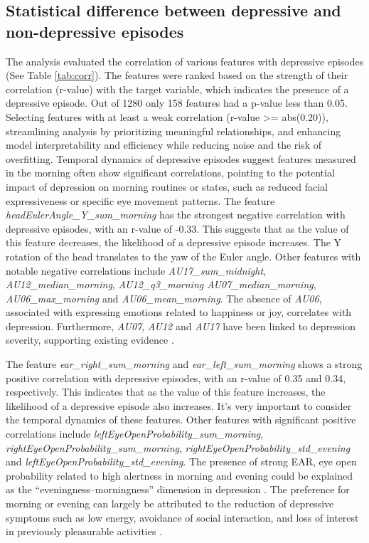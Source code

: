 \subsection{Statistical difference between depressive and non-depressive episodes}

The analysis evaluated the correlation of various features with depressive episodes (See Table \ref{tab:corr}). The features were ranked based on the strength of their correlation (r-value) with the target variable, which indicates the presence of a depressive episode. Out of 1280 only 158 features had a p-value less than 0.05. Selecting features with at least a weak correlation (r-value >= abs(0.20)), streamlining analysis by prioritizing meaningful relationships, and enhancing model interpretability and efficiency while reducing noise and the risk of overfitting. Temporal dynamics of depressive episodes suggest features measured in the morning often show significant correlations, pointing to the potential impact of depression on morning routines or states, such as reduced facial expressiveness or specific eye movement patterns. The feature \textit{headEulerAngle\_Y\_sum\_morning} has the strongest negative correlation with depressive episodes, with an r-value of -0.33. This suggests that as the value of this feature decreases, the likelihood of a depressive episode increases. The Y rotation of the head translates to the yaw of the Euler angle. Other features with notable negative correlations include \textit{AU17\_sum\_midnight}, \textit{AU12\_median\_morning}, \textit{AU12\_q3\_morning} \textit{AU07\_median\_morning}, \textit{AU06\_max\_morning} and \textit{AU06\_mean\_morning}. The absence of \textit{AU06}, associated with expressing emotions related to happiness or joy, correlates with depression. Furthermore, \textit{AU07}, \textit{AU12} and \textit{AU17} have been linked to depression severity, supporting existing evidence \cite{song2020spectral, gavrilescu2019predicting}.

The feature \textit{ear\_right\_sum\_morning} and \textit{ear\_left\_sum\_morning} shows a strong positive correlation with depressive episodes, with an r-value of 0.35 and 0.34, respectively. This indicates that as the value of this feature increases, the likelihood of a depressive episode also increases. It's very important to consider the temporal dynamics of these features. Other features with significant positive correlations include \textit{leftEyeOpenProbability\_sum\_morning}, \textit{rightEyeOpenProbability\_sum\_morning}, \textit{rightEyeOpenProbability\_std\_evening} and \textit{leftEyeOpenProbability\_std\_evening}. The presence of strong EAR, eye open probability related to high alertness \cite{abe2023perclos} in morning and evening could be explained as the “eveningness–morningness” dimension in depression \cite{chelminski1999analysis}. The preference for morning or evening can largely be attributed to the reduction of depressive symptoms such as low energy, avoidance of social interaction, and loss of interest in previously pleasurable activities \cite{putilov2017state}. 

